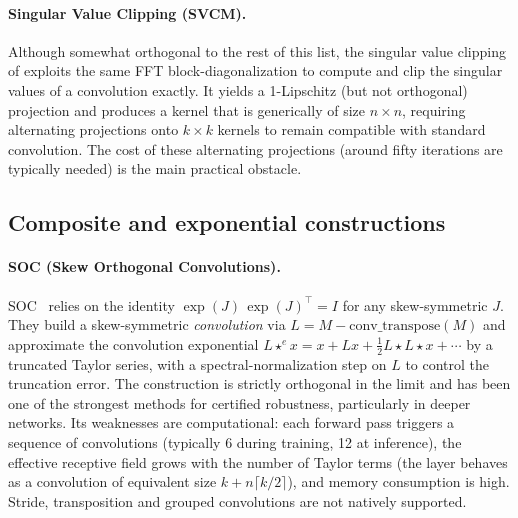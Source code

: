         \paragraph{Singular Value Clipping (SVCM).}
        Although somewhat orthogonal to the rest of this list, the singular value clipping of \cite{sedghi_singular_2019} exploits the same FFT block-diagonalization to compute and clip the singular values of a convolution exactly. It yields a 1-Lipschitz (but not orthogonal) projection and produces a kernel that is generically of size $n \times n$, requiring alternating projections onto $k \times k$ kernels to remain compatible with standard convolution. The cost of these alternating projections (around fifty iterations are typically needed) is the main practical obstacle.

    \subsection{Composite and exponential constructions}

        \paragraph{SOC (Skew Orthogonal Convolutions).}
        SOC~\cite{singla_skew_2021} relies on the identity $\exp(J)\,\exp(J)^\top = I$ for any skew-symmetric $J$. They build a skew-symmetric \emph{convolution} via $L = M - \mathrm{conv\_transpose}(M)$ and approximate the convolution exponential $L \star^e x = x + Lx + \tfrac{1}{2}L\star L\star x + \cdots$ by a truncated Taylor series, with a spectral-normalization step on $L$ to control the truncation error. The construction is strictly orthogonal in the limit and has been one of the strongest methods for certified robustness, particularly in deeper networks. Its weaknesses are computational: each forward pass triggers a sequence of convolutions (typically 6 during training, 12 at inference), the effective receptive field grows with the number of Taylor terms (the layer behaves as a convolution of equivalent size $k + n\lceil k/2 \rceil$), and memory consumption is high. Stride, transposition and grouped convolutions are not natively supported.

